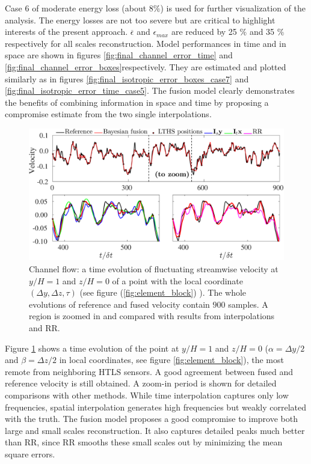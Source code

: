 Case 6 of moderate energy loss (about $ 8 \% $) is used for further visualization of the analysis. The energy losses are not too severe but are critical to highlight interests of the present approach. $ \overline{\epsilon} $  and $ \epsilon_{max} $ are reduced by 25 $ \% $ and 35 $ \% $ respectively for all scales reconstruction. Model performances in time and in space are shown in figures \ref{fig:final_channel_error_time} and  \ref{fig:final_channel_error_boxes}respectively. They are estimated and plotted similarly as in figures \ref{fig:final_isotropic_error_boxes_case7} and \ref{fig:final_isotropic_error_time_case5}. The fusion model clearly demonstrates the benefits of combining information in space and time by proposing a compromise estimate from the two single interpolations. 


\begin{figure}
\begin{center}
\includegraphics[width=\columnwidth]{./images/comparisons/channel/improper_point_spacespacing_10_timespacing_10_yid129_zid149.eps}
\caption{\label{fig:final_channel_timeseries} Channel flow: a time evolution of fluctuating streamwise velocity at $ y/H=1 $ and $ z/H=0 $ of a point with the local coordinate $ (\Delta y,\Delta z, \tau) $  (see figure (\ref{fig:element_block}) ). The whole evolutions of reference and fused velocity contain $ 900 $ samples. A region is zoomed in and compared with results from interpolations and RR.}
\end{center}
\end{figure}

Figure \ref{fig:final_channel_timeseries} shows a time evolution of the point at $ y/H=1 $ and $ z/H=0 $ ($ \alpha=\Delta y /2 $ and $ \beta = \Delta z/2 $ in local coordinates, see figure \ref{fig:element_block}), the most remote from neighboring HTLS sensors. A good agreement between fused and reference velocity is still obtained. A zoom-in period is shown for detailed comparisons with other methods. While time interpolation captures only low frequencies, spatial interpolation generates high frequencies but weakly correlated with the truth. The fusion model proposes a good compromise to improve both large and small scales reconstruction. It also captures detailed peaks much better than RR, since RR smooths these small scales out by minimizing the mean square errors. 

